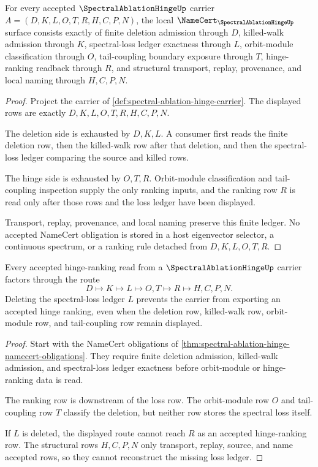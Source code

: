 \begin{theorem}
\label{thm:spectral-ablation-hinge-namecert-obligations}
For every accepted $\SpectralAblationHingeUp$ carrier $A=(D,K,L,O,T,R,H,C,P,N)$, the local $\NameCert_{\SpectralAblationHingeUp}$ surface consists exactly of finite deletion admission through $D$, killed-walk admission through $K$, spectral-loss ledger exactness through $L$, orbit-module classification through $O$, tail-coupling boundary exposure through $T$, hinge-ranking readback through $R$, and structural transport, replay, provenance, and local naming through $H,C,P,N$.
\end{theorem}
\begin{proof}
Project the carrier of \autoref{def:spectral-ablation-hinge-carrier}. The displayed rows are exactly $D,K,L,O,T,R,H,C,P,N$.

The deletion side is exhausted by $D,K,L$. A consumer first reads the finite deletion row, then the killed-walk row after that deletion, and then the spectral-loss ledger comparing the source and killed rows.

The hinge side is exhausted by $O,T,R$. Orbit-module classification and tail-coupling inspection supply the only ranking inputs, and the ranking row $R$ is read only after those rows and the loss ledger have been displayed.

Transport, replay, provenance, and local naming preserve this finite ledger. No accepted NameCert obligation is stored in a host eigenvector selector, a continuous spectrum, or a ranking rule detached from $D,K,L,O,T,R$.
\end{proof}

\begin{theorem}
\label{thm:spectral-ablation-hinge-loss-route}
Every accepted hinge-ranking read from a $\SpectralAblationHingeUp$ carrier factors through the route
$$
D \longmapsto K \longmapsto L \longmapsto O,T \longmapsto R \longmapsto H,C,P,N .
$$
Deleting the spectral-loss ledger $L$ prevents the carrier from exporting an accepted hinge ranking, even when the deletion row, killed-walk row, orbit-module row, and tail-coupling row remain displayed.
\end{theorem}
\begin{proof}
Start with the NameCert obligations of \autoref{thm:spectral-ablation-hinge-namecert-obligations}. They require finite deletion admission, killed-walk admission, and spectral-loss ledger exactness before orbit-module or hinge-ranking data is read.

The ranking row is downstream of the loss row. The orbit-module row $O$ and tail-coupling row $T$ classify the deletion, but neither row stores the spectral loss itself.

If $L$ is deleted, the displayed route cannot reach $R$ as an accepted hinge-ranking row. The structural rows $H,C,P,N$ only transport, replay, source, and name accepted rows, so they cannot reconstruct the missing loss ledger.
\end{proof}

